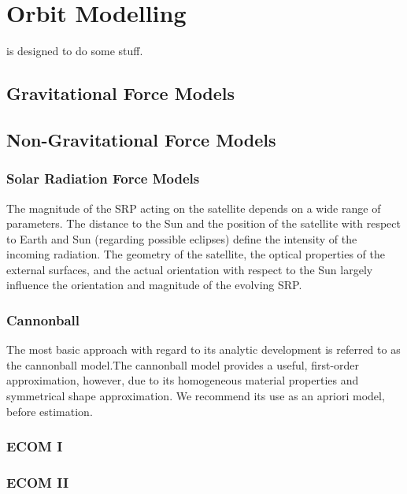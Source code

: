 \chapter{Orbit Modelling}
\label{ch:orbit_modelling}


 is designed to do some stuff.

\section{Gravitational Force Models}

\section{Non-Gravitational Force Models}

\subsection{Solar Radiation Force Models}
The magnitude of the SRP acting on the satellite depends on a wide range of parameters. 
The distance to the Sun and the position of the satellite with respect to Earth and Sun (regarding possible eclipses) define the intensity of the incoming radiation.
 The geometry of the satellite, the optical properties of the external surfaces, and the actual orientation with respect to the Sun largely influence the orientation and magnitude of the evolving SRP.
 
\subsection{Cannonball}
\label{sec:cannonball_srp}
The most basic approach with regard to its analytic development is referred to as the cannonball
model.The cannonball model provides a useful, first-order approximation, however, due to its homogeneous material properties and symmetrical shape approximation. We recommend its use as an apriori model, before estimation.

\subsection{ECOM I}

\subsection{ECOM II}

